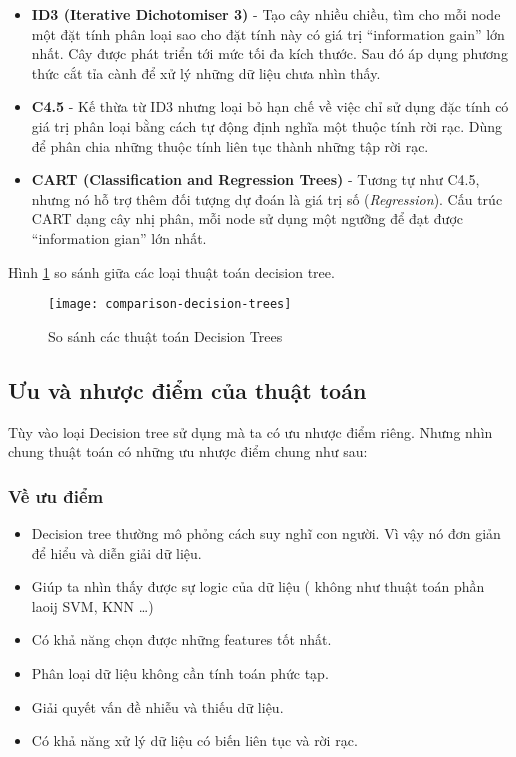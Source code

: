 \documentclass[../main-report.tex]{subfiles}
\begin{document}
\begin{itemize}
\item \textbf{ID3 (Iterative Dichotomiser 3)} - Tạo cây nhiều chiều, tìm cho mỗi node một đặt tính phân loại sao cho đặt tính này có giá trị ``information gain'' lớn nhất. Cây được phát triển tới mức tối đa kích thước. Sau đó áp dụng phương thức cắt tỉa cành để xử lý những dữ liệu chưa nhìn thấy.
\item \textbf{C4.5} - Kế thừa từ  ID3 nhưng loại bỏ hạn chế về việc chỉ sử dụng đặc tính có giá trị phân loại bằng cách tự động định nghĩa một thuộc tính rời rạc. Dùng để phân chia những thuộc tính liên tục thành những tập rời rạc.
\item \textbf{CART (Classification and Regression Trees)} - Tương tự như C4.5, nhưng nó hỗ trợ thêm đối tượng dự đoán là giá trị số (\textit{Regression}). Cấu trúc CART dạng cây nhị phân, mỗi node sử dụng một ngưỡng để đạt được ``information gian'' lớn nhất.
\end{itemize}

Hình \ref{fig:decision_tree_type_comparison} so sánh giữa các loại thuật toán decision tree.

\begin{figure}[ht!]
\centering\texttt{[image: comparison-decision-trees]}
\caption{So sánh các thuật toán Decision Trees}
\label{fig:decision_tree_type_comparison}
\end{figure}

\subsection{Ưu và nhược điểm của thuật toán}
Tùy vào loại Decision tree sử dụng mà ta có ưu nhược điểm riêng. Nhưng nhìn chung thuật toán có những ưu nhược điểm chung như sau:
\subsubsection*{Về ưu điểm}
\begin{itemize}
\item Decision tree thường mô phỏng cách suy nghĩ con người. Vì vậy nó đơn giản để hiểu và diễn giải dữ liệu.
\item Giúp ta nhìn thấy được sự logic của dữ liệu ( không như thuật toán phần laoij SVM, KNN …)
\item Có khả năng chọn được những features tốt nhất.
\item Phân loại dữ liệu không cần tính toán phức tạp.
\item Giải quyết vấn đề nhiễu và thiếu dữ liệu.
\item Có khả năng xử lý dữ liệu có biến liên tục và rời rạc.
\end{itemize}
\end{document}
